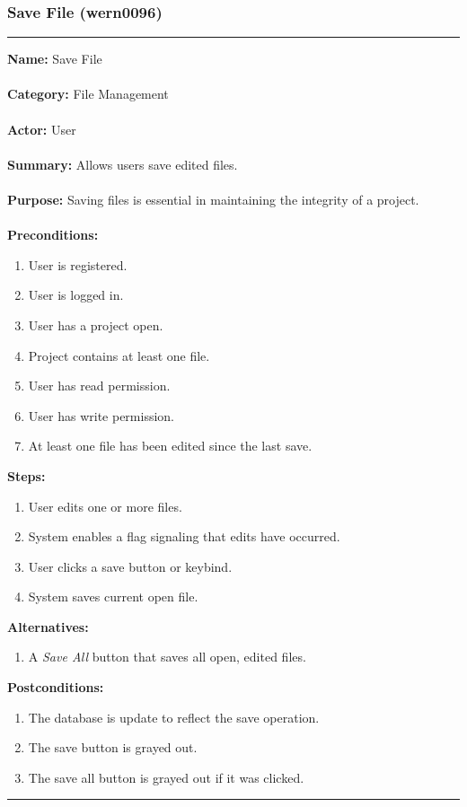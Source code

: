 \documentclass[11pt]{report}
\begin{document}
\subsubsection{Save File (wern0096)}
\vspace{2pt}
\hrule
\vspace{8pt}
	\noindent\textbf{Name:} Save File \\ \\
	\textbf{Category:} File Management \\ \\
	\textbf{Actor:} User \\ \\
	\textbf{Summary:} Allows users save edited files. \\ \\
	\textbf{Purpose:} Saving files is essential in maintaining the integrity of a project. \\ \\
	\textbf{Preconditions:} 
	\begin{enumerate}
		\item User is registered.
		\item User is logged in.
		\item User has a project open.
		\item Project contains at least one file.
		\item User has read permission.
		\item User has write permission.
		\item At least one file has been edited since the last save.
	\end{enumerate}		
	\textbf{Steps:}
	\begin{enumerate}
		\item User edits one or more files.
		\item System enables a flag signaling that edits have occurred.
		\item User clicks a save button or keybind.
		\item System saves current open file.
	\end{enumerate}	
	\textbf{Alternatives:} 
	\begin{enumerate}
		\item A \textit{Save All} button that saves all open, edited files.
	\end{enumerate}
	\textbf{Postconditions:}
	\begin{enumerate}
		\item The database is update to reflect the save operation.
		\item The save button is grayed out.
		\item The save all button is grayed out if it was clicked.
	\end{enumerate}
\hrule
\vspace{8pt}
\end{document}
